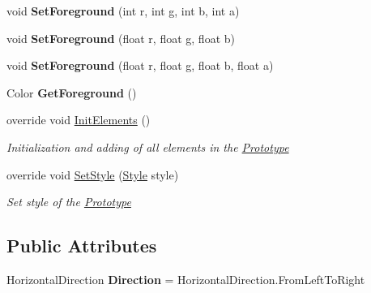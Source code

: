 \begin{DoxyCompactItemize}
\mbox{\label{class_space_v_i_l_1_1_title_bar_a80ce4acd717c586dc99b9921ad94a921}} 
void {\bfseries Set\+Foreground} (int r, int g, int b, int a)
\item 
\mbox{\label{class_space_v_i_l_1_1_title_bar_a0e5be0d6e8e6acb165d0e29bd6194560}} 
void {\bfseries Set\+Foreground} (float r, float g, float b)
\item 
\mbox{\label{class_space_v_i_l_1_1_title_bar_a0ff4b2693c246b9f792b7b277666f7bc}} 
void {\bfseries Set\+Foreground} (float r, float g, float b, float a)
\item 
\mbox{\label{class_space_v_i_l_1_1_title_bar_a239f4c7ef7246e25d6f5ccf3b2237fec}} 
Color {\bfseries Get\+Foreground} ()
\item 
override void \mbox{\hyperlink{class_space_v_i_l_1_1_title_bar_a8ee9e176f0eb7d4fcf1a4309bd8c2925}{Init\+Elements}} ()
\begin{DoxyCompactList}\small\item\em Initialization and adding of all elements in the \mbox{\hyperlink{class_space_v_i_l_1_1_prototype}{Prototype}} \end{DoxyCompactList}\item 
override void \mbox{\hyperlink{class_space_v_i_l_1_1_title_bar_aaeec14fb90014f8f6f922214958ce798}{Set\+Style}} (\mbox{\hyperlink{class_space_v_i_l_1_1_decorations_1_1_style}{Style}} style)
\begin{DoxyCompactList}\small\item\em Set style of the \mbox{\hyperlink{class_space_v_i_l_1_1_prototype}{Prototype}} \end{DoxyCompactList}\end{DoxyCompactItemize}
\subsection*{Public Attributes}
\begin{DoxyCompactItemize}
\item 
\mbox{\label{class_space_v_i_l_1_1_title_bar_a03dafd5558defb6ee796bd0e9ac62878}} 
Horizontal\+Direction {\bfseries Direction} = Horizontal\+Direction.\+From\+Left\+To\+Right
\end{DoxyCompactItemize}

